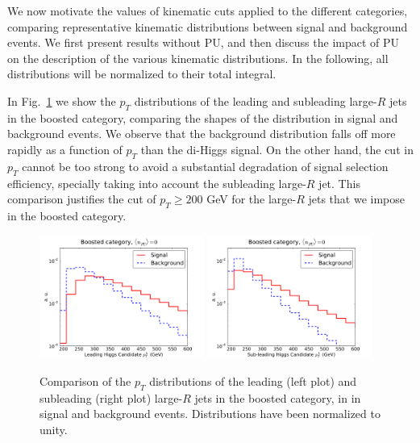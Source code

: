 We now motivate the values of
kinematic cuts applied to the different categories, 
comparing representative kinematic distributions between
signal and background events.
%
We first present results without PU, and then
discuss
the impact of PU
on the description of the various kinematic
distributions.
%
In the following, all
distributions will be normalized to their total integral.


In Fig.~\ref{fig:cutplots1} we show
the $p_T$ distributions
of the
  leading and subleading large-$R$ jets in the boosted category, comparing
  the shapes of the distribution in signal and background events.
  We observe that the background distribution
falls off more rapidly as a function of $p_T$ than the di-Higgs signal.
  On the other hand, the cut in $p_T$ cannot be too strong to avoid
  a substantial degradation of signal selection efficiency,
  specially taking into account the subleading large-$R$ jet.
  This comparison justifies the cut of $p_T \ge 200$ GeV
  for the large-$R$ jets that we impose in the boosted category.
  

\begin{figure}[t]
\begin{center}
 \includegraphics[width=0.48\textwidth]{plots/pt_H0_bst_C1d_noPU.pdf}
 \includegraphics[width=0.48\textwidth]{plots/pt_H1_bst_C1d_noPU.pdf}
\caption{\small  Comparison of the $p_T$ distributions of the
  leading (left plot) and
  subleading (right plot) large-$R$ jets in the boosted category,
  in in signal and background events.
  Distributions have been normalized to unity.
}
\label{fig:cutplots1}
\end{center}
\end{figure}


